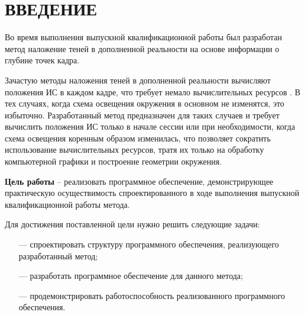 \chapter*{ВВЕДЕНИЕ}

Во время выполнения выпускной квалификационной работы был разработан метод наложение теней в дополненной реальности на основе информации о глубине точек кадра. 

Зачастую методы наложения теней в дополненной реальности вычисляют положения ИС в каждом кадре, что требует немало вычислительных ресурсов \cite{osti2019real}. В тех случаях, когда схема освещения окружения в основном не изменятся, это избыточно. Разработанный метод предназначен для таких случаев и требует вычислить положения ИС только в начале сессии или при необходимости, когда схема освещения коренным образом изменилась, что позволяет сократить использование вычислительных ресурсов, тратя их только на обработку компьютерной графики и построение геометрии окружения.

\textbf{Цель работы} -- реализовать программное обеспечение, демонстрирующее практическую осуществимость спроектированного в ходе выполнения выпускной квалификационной работы метода.

Для достижения поставленной цели нужно решить следующие задачи:

\begin{itemize}
	\item[---] спроектировать структуру программного обеспечения, реализующего разработанный метод;
	\item[---] разработать программное обеспечение для данного метода;
	\item[---] продемонстрировать работоспособность реализованного программного обеспечения.
\end{itemize}